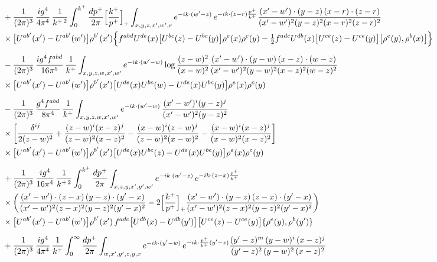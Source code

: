 \documentclass[10pt]{article}
\begin{document}
\begin{align}
&+\frac{1}{(2\pi)^{3}}\,\frac{ig^{4}}{4\pi^{4}}\,\frac{1}{k^{+\,2}}\int_{0}^{k^{+}}\frac{dp^{+}}{2\pi}\Big[\frac{k^{+}}{p^{+}}\Big]_{+}\int_{x,y,z,x',w',r}e^{-ik\cdot(w'-z)}\,e^{-ik\cdot(z-r)\frac{p^{+}}{k^{+}}}\frac{(x'-w')\cdot(y-z)\,(x-r)\cdot(z-r)}{(x'-w')^{2}(y-z)^{2}(x-r)^{2}(z-r)^{2}}\notag\\
&\times\big[U^{ab'}(x')-U^{ab'}(w')\big]\rho^{b'}(x')\Big\{f^{abd}U^{de}(x)\big[U^{bc}(z)-U^{bc}(y)\big]\rho^{e}(x)\rho^{c}(y)-\tfrac12f^{adc}U^{db}(x)\big[U^{ce}(z)-U^{ce}(y)\big]\big[\rho^{e}(y),\rho^{b}(x)\big]\Big\}\notag\\[6pt]
&-\frac{1}{(2\pi)^{3}}\,\frac{ig^{4}f^{abd}}{16\pi^{5}}\,\frac{1}{k^{+}}\int_{x,y,z,w,x',w'}e^{-ik\cdot(w'-w)}\log\frac{(z-w)^{2}}{(x-w)^{2}}\frac{(x'-w')\cdot(y-w)\,(x-z)\cdot(w-z)}{(x'-w')^{2}(y-w)^{2}(x-z)^{2}(w-z)^{2}}\notag\\
&\times\big[U^{ab'}(x')-U^{ab'}(w')\big]\rho^{b'}(x')\big[U^{de}(x)U^{bc}(w)-U^{de}(x)U^{bc}(y)\big]\rho^{e}(x)\rho^{c}(y)\notag\\[6pt]
&-\frac{1}{(2\pi)^{3}}\,\frac{g^{4}f^{abd}}{8\pi^{4}}\,\frac{1}{k^{+}}\int_{x,y,z,w,x',w'}e^{-ik\cdot(w'-w)}\,\frac{(x'-w')^{i}(y-z)^{j}}{(x'-w')^{2}(y-z)^{2}}\notag\\
&\times\bigg[\frac{\delta^{ij}}{2(z-w)^{2}}+\frac{(z-w)^{i}(x-z)^{j}}{(z-w)^{2}(x-z)^{2}}-\frac{(x-w)^{i}(z-w)^{j}}{(z-w)^{2}(x-w)^{2}}-\frac{(x-w)^{i}(x-z)^{j}}{(x-w)^{2}(x-z)^{2}}\bigg]\notag\\
&\times\big[U^{ab'}(x')-U^{ab'}(w')\big]\rho^{b'}(x')\big[U^{de}(x)U^{bc}(z)-U^{de}(x)U^{bc}(y)\big]\rho^{e}(x)\rho^{c}(y)\notag\\[6pt]
&+\frac{1}{(2\pi)^{3}}\,\frac{ig^{4}}{16\pi^{4}}\,\frac{1}{k^{+\,2}}\int_{0}^{k^{+}}\frac{dp^{+}}{2\pi}\int_{x,z,y,x',y',w'}e^{-ik\cdot(w'-z)}\,e^{-ik\cdot(z-x)\frac{p^{+}}{k^{+}}}\notag\\
&\times\bigg(\frac{(x'-w')\cdot(z-x)\,(y-z)\cdot(y'-x)}{(x'-w')^{2}(z-x)^{2}(y-z)^{2}(y'-x)^{2}}-2\Big[\frac{k^{+}}{p^{+}}\Big]_{+}\frac{(x'-w')\cdot(y-z)\,(z-x)\cdot(y'-x)}{(x'-w')^{2}(z-x)^{2}(y-z)^{2}(y'-x)^{2}}\bigg)\notag\\
&\times\big[U^{ab'}(x')-U^{ab'}(w')\big]\rho^{b'}(x')\,f^{adc}\big[U^{db}(x)-U^{db}(y')\big]\big[U^{ce}(z)-U^{ce}(y)\big]\{\rho^{e}(y),\rho^{b}(y')\}\notag\\[6pt]
&+\frac{1}{(2\pi)^{3}}\,\frac{ig^{4}}{4\pi^{4}}\,\frac{1}{k^{+}}\int_{0}^{\infty}\frac{dp^{+}}{2\pi}\int_{w,x',y',z,y,x}e^{-ik\cdot(y'-w)}\,e^{-ik\cdot\frac{p^{+}}{k^{+}}(y'-z)}\frac{(y'-z)^{m}\,(y-w)^{i}\,(x-z)^{j}}{(y'-z)^{2}\,(y-w)^{2}\,(x-z)^{2}}\notag\\

\end{align}
\end{document}
